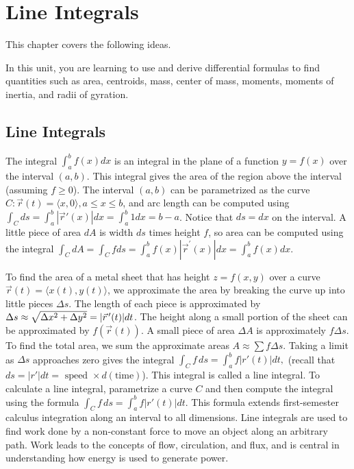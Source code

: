 
\chapter{Line Integrals}

This chapter covers the following ideas. 


In this unit, you are learning to use and derive differential formulas
to find quantities such as area, centroids, mass, center of mass,
moments, moments of inertia, and radii of gyration.

\section{Line Integrals}

The integral $\int_a^b f(x)dx$ is an integral in the plane of a function
$y=f(x)$ over the interval $(a,b)$.  This integral gives the area of
the region above the interval (assuming $f\geq 0$).  The interval $(a,b)$
can be parametrized as the curve $C\colon\vec r(t)= \langle x,0\rangle, a\leq x\leq
b$, and arc length can be computed using $\int_C ds = \int_a^b |\vec
r'(x)|dx = \int_a^b 1 dx = b-a$. Notice that $ds=dx$ on the interval. A
little piece of area $dA$ is width $ds$ times height $f$, so area can
be computed using the integral $\int_C dA = \int_C f ds = \int_a^b f(x)|\vec
r^\prime(x)|dx = \int_a^b f(x) dx$. 

To find the area of a metal sheet that has height $z=f(x,y) $ over a
curve $ \vec r(t)=\langle x(t),y(t)\rangle $, we approximate the area by breaking
the curve up into little pieces $\Delta s$. The length of each piece is
approximated by {$ \Delta s \approx \sqrt{\Delta x^2 +\Delta y^2} =|\vec r^{\,\prime}(t)|dt$}. The
height along a small portion of the sheet can be approximated by
$f(\vec r(t))$. A small piece of area $\Delta A$ is approximately $f\Delta s
$. To find the total area, we sum the approximate areas $A\approx \sum f\Delta s$.
Taking a limit as $\Delta s$ approaches zero gives the integral $ \int_C f \,ds
= \int_a^b f |r'(t)|dt,$ (recall that $ds = |r'| dt = \text{ speed } \times
d(\text{time})$).  This integral is called a line integral.  To
calculate a line integral, parametrize a curve $C$ and then compute
the integral using the formula $ \int_C f\,ds = \int_a^b f |r'(t)|dt $. This
formula extends first-semester calculus integration along an interval
to all dimensions.  Line integrals are used to find work done by a
non-constant force to move an object along an arbitrary path. Work
leads to the concepts of flow, circulation, and flux, and is central
in understanding how energy is used to generate power.


